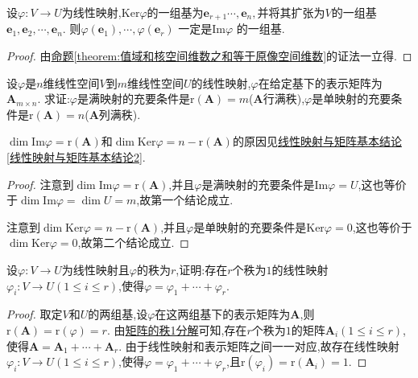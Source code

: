 \documentclass[../../main.tex]{subfiles}
\begin{document}
\begin{corollary}\label{corollary:由核的基导出值域的基}
设\(\varphi:V\to U\)为线性映射,$\mathrm{Ker}\varphi $的一组基为$\boldsymbol{e}_{r+1}\cdots ,\boldsymbol{e}_n,$并将其扩张为$V$的一组基$\boldsymbol{e}_1,\boldsymbol{e}_2,\cdots ,\boldsymbol{e}_n.$
则$\varphi \left( \boldsymbol{e}_1 \right) ,\cdots ,\varphi \left( \boldsymbol{e}_r \right)$ 一定是Im$\varphi$ 的一组基.
\end{corollary}
\begin{proof}
由\hyperref[theorem:值域和核空间维数之和等于原像空间维数]{命题\ref{theorem:值域和核空间维数之和等于原像空间维数}}的证法一立得.


\end{proof}
\begin{proposition}\label{proposition:行/列满秩矩阵对应满/单射}
设\(\varphi\)是\(n\)维线性空间\(V\)到\(m\)维线性空间\(U\)的线性映射,\(\varphi\)在给定基下的表示矩阵为\(\boldsymbol{A}_{m\times n}\). 求证:\(\varphi\)是满映射的充要条件是\(\text{r}(\boldsymbol{A}) = m\)($\boldsymbol{A}$行满秩),\(\varphi\)是单映射的充要条件是\(\text{r}(\boldsymbol{A}) = n\)($\boldsymbol{A}$列满秩).
\end{proposition}
\begin{note}
\(\dim\text{Im}\varphi=\text{r}(\boldsymbol{A})\)和\(\dim\text{Ker}\varphi=n - \text{r}(\boldsymbol{A})\)的原因见\hyperref[线性映射与矩阵基本结论2]{线性映射与矩阵基本结论\ref{线性映射与矩阵基本结论2}}.
\end{note}
\begin{proof}
注意到\(\dim\text{Im}\varphi=\text{r}(\boldsymbol{A})\),并且\(\varphi\)是满映射的充要条件是\(\text{Im}\varphi = U\),这也等价于\(\dim\text{Im}\varphi=\dim U = m\),故第一个结论成立.

注意到\(\dim\text{Ker}\varphi=n - \text{r}(\boldsymbol{A})\),并且\(\varphi\)是单映射的充要条件是\(\text{Ker}\varphi = 0\),这也等价于\(\dim\text{Ker}\varphi = 0\),故第二个结论成立.

\end{proof}

\begin{proposition}\label{proposition:线性映射的秩1分解}
设\(\varphi:V\to U\)为线性映射且\(\varphi\)的秩为\(r\),证明:存在\(r\)个秩为\(1\)的线性映射\(\varphi_i:V\to U(1\leqslant  i\leqslant  r)\),使得\(\varphi=\varphi_1+\cdots+\varphi_r\).
\end{proposition}
\begin{proof}
取定\(V\)和\(U\)的两组基,设\(\varphi\)在这两组基下的表示矩阵为\(\boldsymbol{A}\),则\(\text{r}(\boldsymbol{A})=\text{r}(\varphi)=r\). 由\hyperref[proposition:矩阵的秩1分解]{矩阵的秩1分解}可知,存在\(r\)个秩为\(1\)的矩阵\(\boldsymbol{A}_i(1\leqslant  i\leqslant  r)\),使得\(\boldsymbol{A}=\boldsymbol{A}_1+\cdots+\boldsymbol{A}_r\). 由于线性映射和表示矩阵之间一一对应,故存在线性映射\(\varphi_i:V\to U(1\leqslant  i\leqslant  r)\),使得\(\varphi=\varphi_1+\cdots+\varphi_r\),且\(\text{r}(\varphi_i)=\text{r}(\boldsymbol{A}_i)=1\).

\end{proof}
\end{document}
